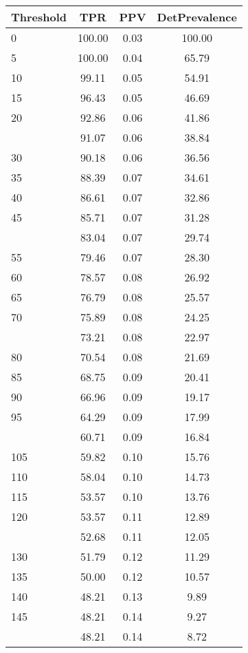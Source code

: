\begin{table}[ht]
\centering
\begin{tabular}{lccc}
  \toprule
Threshold & TPR & PPV & DetPrevalence \\ 
  \midrule
0 & 100.00 & 0.03 & 100.00 \\ 
  5 & 100.00 & 0.04 & 65.79 \\ 
  10 & 99.11 & 0.05 & 54.91 \\ 
  15 & 96.43 & 0.05 & 46.69 \\ 
  20 & 92.86 & 0.06 & 41.86 \\ 
   \addlinespace
25 & 91.07 & 0.06 & 38.84 \\ 
  30 & 90.18 & 0.06 & 36.56 \\ 
  35 & 88.39 & 0.07 & 34.61 \\ 
  40 & 86.61 & 0.07 & 32.86 \\ 
  45 & 85.71 & 0.07 & 31.28 \\ 
   \addlinespace
50 & 83.04 & 0.07 & 29.74 \\ 
  55 & 79.46 & 0.07 & 28.30 \\ 
  60 & 78.57 & 0.08 & 26.92 \\ 
  65 & 76.79 & 0.08 & 25.57 \\ 
  70 & 75.89 & 0.08 & 24.25 \\ 
   \addlinespace
75 & 73.21 & 0.08 & 22.97 \\ 
  80 & 70.54 & 0.08 & 21.69 \\ 
  85 & 68.75 & 0.09 & 20.41 \\ 
  90 & 66.96 & 0.09 & 19.17 \\ 
  95 & 64.29 & 0.09 & 17.99 \\ 
   \addlinespace
100 & 60.71 & 0.09 & 16.84 \\ 
  105 & 59.82 & 0.10 & 15.76 \\ 
  110 & 58.04 & 0.10 & 14.73 \\ 
  115 & 53.57 & 0.10 & 13.76 \\ 
  120 & 53.57 & 0.11 & 12.89 \\ 
   \addlinespace
125 & 52.68 & 0.11 & 12.05 \\ 
  130 & 51.79 & 0.12 & 11.29 \\ 
  135 & 50.00 & 0.12 & 10.57 \\ 
  140 & 48.21 & 0.13 & 9.89 \\ 
  145 & 48.21 & 0.14 & 9.27 \\ 
   \addlinespace
150 & 48.21 & 0.14 & 8.72 \\ 

\end{tabular}
\end{table}
